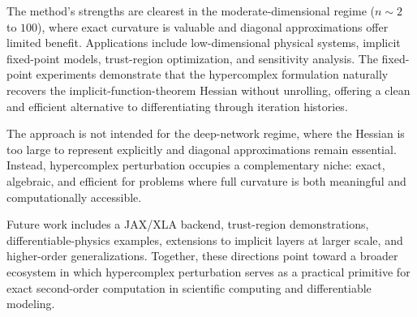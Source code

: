 The method's strengths are clearest in the moderate-dimensional regime ($n \sim 2$ to
$100$), where exact curvature is valuable and diagonal approximations offer limited
benefit. Applications include low-dimensional physical systems, implicit fixed-point
models, trust-region optimization, and sensitivity analysis. The fixed-point
experiments demonstrate that the hypercomplex formulation naturally recovers the
implicit-function-theorem Hessian without unrolling, offering a clean and efficient
alternative to differentiating through iteration histories.

The approach is not intended for the deep-network regime, where the Hessian is too
large to represent explicitly and diagonal approximations remain essential. Instead,
hypercomplex perturbation occupies a complementary niche: exact, algebraic, and
efficient for problems where full curvature is both meaningful and computationally
accessible.

Future work includes a JAX/XLA backend, trust-region demonstrations,
differentiable-physics examples, extensions to implicit layers at larger scale, and
higher-order generalizations. Together, these directions point toward a broader
ecosystem in which hypercomplex perturbation serves as a practical primitive for exact
second-order computation in scientific computing and differentiable modeling.



